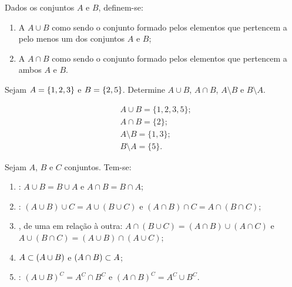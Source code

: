 \begin{definition}
Dados os conjuntos $A$ e $B$, definem-se:
%
\begin{enumerate}
	\item A  $A \cup B$ como sendo o conjunto formado pelos elementos que pertencem a pelo menos um dos conjuntos $A$ e $B$;
	\item A  $A \cap B$ como sendo o conjunto formado pelos elementos que pertencem a ambos $A$ e $B$.
\end{enumerate}
\end{definition}

\begin{example}
Sejam $A = \left\{1, 2, 3\right\}$ e $ B = \left\{2,5\right\}$. Determine $A \cup B$, $A \cap B$, $A \setminus B$ e $B \setminus A$.
\end{example}

\begin{solution}
\begin{align*}
	&A \cup B = \{1,2,3,5\};\\
	&A \cap B = \{2\};\\
	&A \setminus B = \{1,3\};\\
	&B \setminus A = \{5\}.
\end{align*}
\end{solution}

\begin{proposition}
Sejam $A$, $B$ e $C$ conjuntos. Tem-se:
\begin{enumerate}
  \item {}: $A \cup B = B \cup A$ e $A \cap B = B \cap A$;
  \item {}: $\left(A \cup B \right) \cup C = A
  \cup \left( B \cup C \right)$ e $\left(A \cap B \right) \cap C = A
  \cap \left( B \cap C \right)$;
  \item {}, de uma em relação à outra: $A \cap
  \left( B \cup C \right) = \left(A \cap B \right) \cup \left( A \cap C
  \right)$ e $A \cup \left( B \cap C \right) = \left(A \cup B \right) \cap
  \left( A \cup C  \right)$;
  \item $A \subset \left(A \cup B\right)$ e $\left(A \cap B\right) \subset A$;
  \item {}: $\left( A \cup B \right)^C = A^C \cap
  B^C$ e $\left(A \cap B \right)^C = A^C \cup B^C$.

  \end{enumerate}
\end{proposition}

